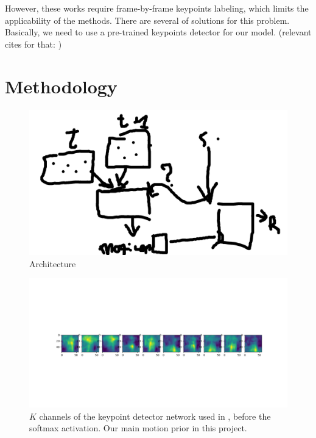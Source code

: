 \documentclass{article}
\begin{document}
 However, these works require frame-by-frame keypoints labeling, which limits the applicability of the methods. There are several of solutions for this problem. Basically, we need to use a pre-trained keypoints detector for our model. (relevant cites for that: \cite{siarohin2019animating} \cite{thewlis2017unsupervised} \cite{zhang2018unsupervised} \cite{jakab2018unsupervised} \cite{newell2016stacked})
\section{Methodology}
\label{method}

\begin{figure}[ht]
\vskip 0.2in
\begin{center}
\centerline{\includegraphics[width=\columnwidth]{second_meeting_pres}}
\caption{
Architecture
}
\label{arch}
\end{center}
\vskip -0.2in
\end{figure}


\begin{figure}[ht]
\vskip 0.2in
\begin{center}
\centerline{\includegraphics[width=\columnwidth]{mask_10kp}}
\caption{
$K$ channels of the keypoint detector network used in
\cite{siarohin2020order}, before the softmax activation. Our main motion
prior in this project.
}
\label{mask-10kp}
\end{center}
\vskip -0.2in
\end{figure}
\end{document}
